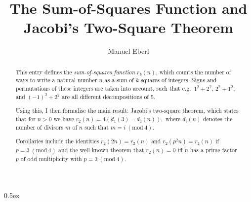 \documentclass[11pt,a4paper]{article}
\begin{document}
\title{The Sum-of-Squares Function and Jacobi's Two-Square Theorem}
\author{Manuel Eberl}
\maketitle

\begin{abstract}
This entry defines the \emph{sum-of-squares function} $r_k(n)$, which counts the number of
ways to write a natural number $n$ as a sum of $k$ squares of integers. Signs and permutations of 
these integers are taken into account, such that e.g.\ $1^2+2^2$, $2^2+1^2$, and $(-1)^2+2^2$
are all different decompositions of $5$.

Using this, I then formalise the main result: Jacobi's two-square theorem, which states that for $n > 0$
we have $r_2(n) = 4(d_1(3) - d_3(n)),$ where $d_i(n)$ denotes the number of divisors $m$ of $n$
such that $m = i\ (\text{mod}\ 4)$.

Corollaries include the identities $r_2(2n) = r_2(n)$ and $r_2(p^2n) = r_2(n)$ if
$p = 3\ (\text{mod}\ 4)$ and the well-known theorem that $r_2(n) = 0$ iff $n$ has a prime
factor $p$ of odd multiplicity with $p = 3\ (\text{mod}\ 4)$.
\end{abstract}

\tableofcontents

\newpage
\parindent 0pt\parskip 0.5ex



\raggedright
\nocite{grosswald2012}


\end{document}
